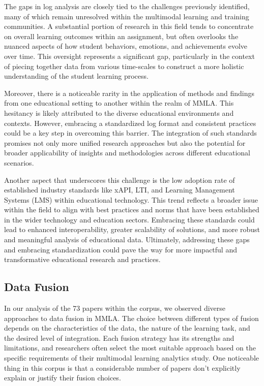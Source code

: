 \documentclass[manuscript,screen,review]{acmart}
\begin{document}
The gaps in log analysis are closely tied to the challenges previously identified, many of which remain unresolved within the multimodal learning and training communities. A substantial portion of research in this field tends to concentrate on overall learning outcomes within an assignment, but often overlooks the nuanced aspects of how student behaviors, emotions, and achievements evolve over time. This oversight represents a significant gap, particularly in the context of piecing together data from various time-scales to construct a more holistic understanding of the student learning process.

Moreover, there is a noticeable rarity in the application of methods and findings from one educational setting to another within the realm of MMLA. This hesitancy is likely attributed to the diverse educational environments and contexts. However, embracing a standardized log format and consistent practices could be a key step in overcoming this barrier. The integration of such standards promises not only more unified research approaches but also the potential for broader applicability of insights and methodologies across different educational scenarios.

Another aspect that underscores this challenge is the low adoption rate of established industry standards like xAPI, LTI, and Learning Management Systems (LMS) within educational technology. This trend reflects a broader issue within the field to align with best practices and norms that have been established in the wider technology and education sectors. Embracing these standards could lead to enhanced interoperability, greater scalability of solutions, and more robust and meaningful analysis of educational data. Ultimately, addressing these gaps and embracing standardization could pave the way for more impactful and transformative educational research and practices.

    
\subsection{Data Fusion}



In our analysis of the 73 papers within the corpus, we observed diverse approaches to data fusion in MMLA. The choice between different types of fusion depends on the characteristics of the data, the nature of the learning task, and the desired level of integration. Each fusion strategy has its strengths and limitations, and researchers often select the most suitable approach based on the specific requirements of their multimodal learning analytics study. One noticeable thing in this corpus is that a considerable number of papers don't explicitly explain or justify their fusion choices.
\end{document}

